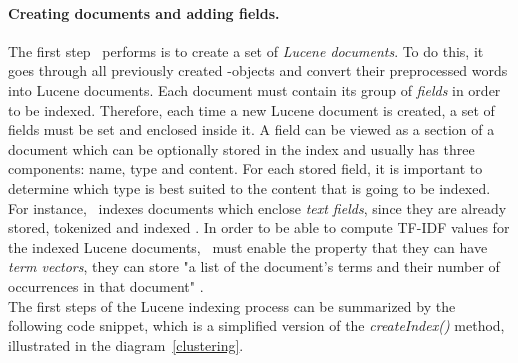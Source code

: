 \paragraph{Creating documents and adding fields.}
The first step \toolname\ performs is to create a set of \textit{Lucene documents}. 
To do this, it goes through all previously created \Crash-objects and convert their preprocessed words into Lucene documents. Each document must contain its group of \textit{fields} in order to be indexed.
Therefore, each time a new Lucene document is created, a set of fields must be set and enclosed inside it. 
A field can be viewed as a section of a document which can be optionally stored in the index \cite{lucenefield} and usually has three components: name, type and content. For each stored field, it is important to determine which type is best suited to the content that is going to be indexed. 
For instance, \toolname\ indexes documents which enclose \textit{text fields}, since they are already stored, tokenized and indexed \cite{lucenetextfield}. 
In order to be able to compute TF-IDF values for the indexed Lucene documents, \toolname\ must enable the property that they can have \textit{term vectors}, \ie they can store "a list of the document's terms and their number of occurrences in that document" \cite{lucenetermvector}. \\
The first steps of the Lucene indexing process can be summarized by the following code snippet, which is a simplified version of the \textit{createIndex()} method, illustrated in the diagram~\ref{clustering}.

